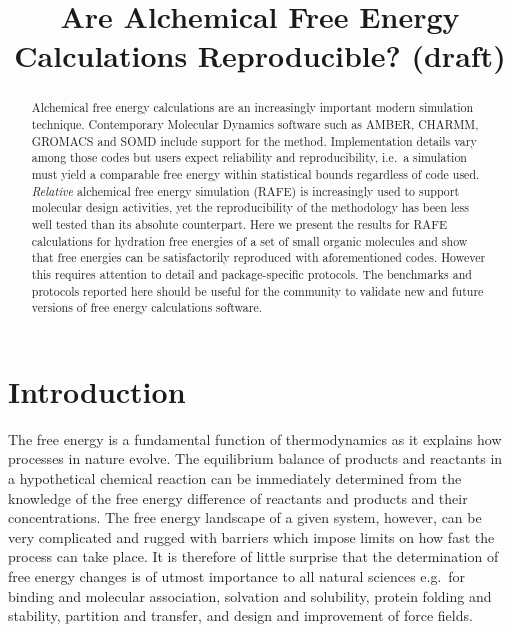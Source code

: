 \documentclass[journal=jctcce,manuscript=article]{achemso}
\title{Are Alchemical Free Energy Calculations Reproducible? (draft)}
\begin{document}
\begin{abstract}
  Alchemical free energy calculations are an increasingly important modern 
  simulation technique.  Contemporary Molecular Dynamics software such as AMBER, CHARMM, GROMACS and SOMD include support for the method. Implementation details vary among those codes but users expect reliability and reproducibility, i.e.\ a simulation must yield a comparable free energy within statistical bounds regardless of code used.  \emph{Relative} alchemical free energy simulation (RAFE) is increasingly used to support molecular design activities, yet the reproducibility of the methodology has been less well tested than its absolute counterpart.  Here we present the results for RAFE calculations for hydration free energies of a set of small 
  organic molecules and show that free energies can be satisfactorily 
  reproduced with aforementioned codes. However this requires attention to 
  detail and package-specific protocols. The benchmarks and protocols reported 
  here should be useful for the community to validate new and future versions of free energy calculations software.
\end{abstract}

\begin{tocentry}
\end{tocentry}


\section{Introduction}
\label{sec:intro}

The free energy is a fundamental function of thermodynamics as it explains 
how processes in nature evolve.  The equilibrium balance of products and reactants in a hypothetical chemical reaction can be immediately determined
from the knowledge of the free energy difference of reactants and
products and their concentrations.  The free energy landscape of a given 
system, however, can be very complicated and rugged with barriers which impose
limits on how fast the process can take place.  It is therefore of
little surprise that the determination of free energy changes is of
utmost importance to all natural sciences e.g.\ for binding and
molecular association, solvation and solubility, protein folding and
stability, partition and transfer, and design and improvement of force
fields. 
\end{document}
